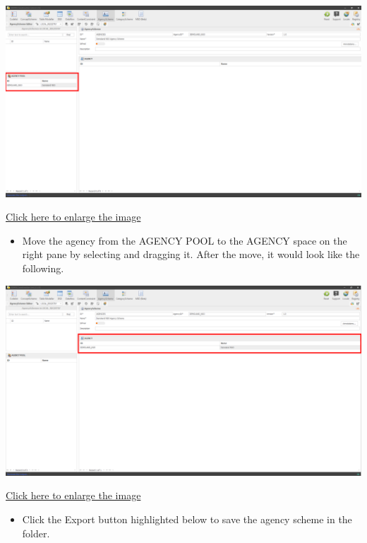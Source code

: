 \documentclass[
]{book}
\providecommand{\tightlist}{%
  \setlength{\itemsep}{0pt}\setlength{\parskip}{0pt}}
\theoremstyle{definition}
\theoremstyle{definition}
\theoremstyle{definition}
\theoremstyle{definition}
\theoremstyle{remark}
\begin{document}
\begin{center}\includegraphics[width=1\linewidth]{./images/image068} \end{center}

\href{images/image068.png}{Click here to enlarge the image}

\begin{itemize}
\tightlist
\item
  Move the agency from the AGENCY POOL to the AGENCY space on the right pane by selecting and dragging it. After the move, it would look like the following.
\end{itemize}

\begin{center}\includegraphics[width=1\linewidth]{./images/image070} \end{center}

\href{images/image070.png}{Click here to enlarge the image}

\begin{itemize}
\tightlist
\item
  Click the Export button highlighted below to save the agency scheme in the folder.
\end{itemize}
\end{document}
